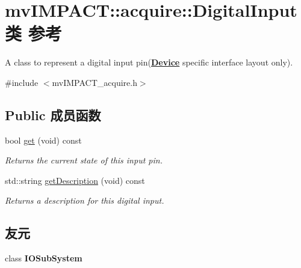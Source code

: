 \hypertarget{classmv_i_m_p_a_c_t_1_1acquire_1_1_digital_input}{\section{mv\+I\+M\+P\+A\+C\+T\+:\+:acquire\+:\+:Digital\+Input类 参考}
\label{classmv_i_m_p_a_c_t_1_1acquire_1_1_digital_input}
}


A class to represent a digital input pin({\bfseries \hyperlink{classmv_i_m_p_a_c_t_1_1acquire_1_1_device}{Device}} specific interface layout only).  




{\ttfamily \#include $<$mv\+I\+M\+P\+A\+C\+T\+\_\+acquire.\+h$>$}

\subsection*{Public 成员函数}
\begin{DoxyCompactItemize}
\item 
bool \hyperlink{classmv_i_m_p_a_c_t_1_1acquire_1_1_digital_input_a747993996c33ddee3d19b2b382c60d8d}{get} (void) const 
\begin{DoxyCompactList}\small\item\em Returns the current state of this input pin. \end{DoxyCompactList}\item 
std\+::string \hyperlink{classmv_i_m_p_a_c_t_1_1acquire_1_1_digital_input_a851ee127d0833987898b52c51c96bc5d}{get\+Description} (void) const 
\begin{DoxyCompactList}\small\item\em Returns a description for this digital input. \end{DoxyCompactList}\end{DoxyCompactItemize}
\subsection*{友元}
\begin{DoxyCompactItemize}
\item 
\hypertarget{classmv_i_m_p_a_c_t_1_1acquire_1_1_digital_input_a3a1008d5502332da6f64a8940aa3a007}{class {\bfseries I\+O\+Sub\+System}}\label{classmv_i_m_p_a_c_t_1_1acquire_1_1_digital_input_a3a1008d5502332da6f64a8940aa3a007}

\end{DoxyCompactItemize}



